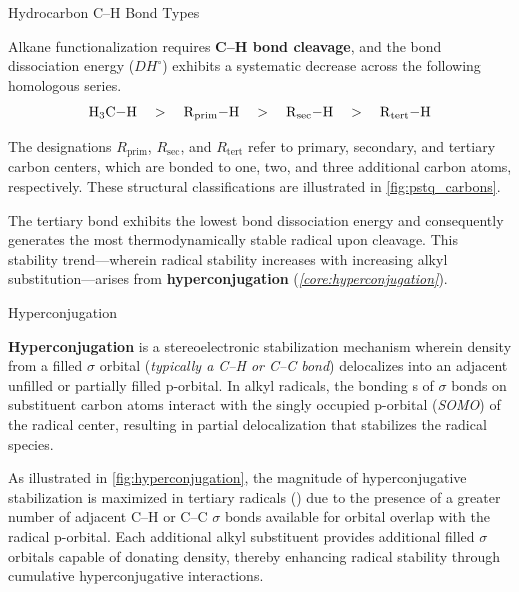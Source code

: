 \documentclass[10pt]{article}
\begin{document}
  \begin{core}{Hydrocarbon C--H Bond Types}

    Alkane functionalization requires \textbf{C--H bond cleavage}, and the bond dissociation energy ($DH^{\circ}$) exhibits a systematic decrease across the following homologous series.
    \[
      \ce{H3C-H} \quad > \quad \ce{R_{prim}-H} \quad > \quad \ce{R_{sec}-H} \quad > \quad \ce{R_{tert}-H}
    \]

    The designations $R_{\text{prim}}$, $R_{\text{sec}}$, and $R_{\text{tert}}$ refer to primary, secondary, and tertiary carbon centers, which are bonded to one, two, and three additional carbon atoms, respectively. These structural classifications are illustrated in \autoref{fig:pstq_carbons}.


    The tertiary  bond exhibits the lowest bond dissociation energy and consequently generates the most thermodynamically stable radical upon cleavage. This stability trend---wherein radical stability increases with increasing alkyl substitution---arises from \textbf{hyperconjugation} (\textit{\autoref{core:hyperconjugation}}).
    
  \end{core}

  \begin{core}[label=core:hyperconjugation]{Hyperconjugation}

    \textbf{Hyperconjugation} is a stereoelectronic stabilization mechanism wherein  density from a filled $\sigma$ orbital (\textit{typically a C--H or C--C bond}) delocalizes into an adjacent unfilled or partially filled p-orbital. In alkyl radicals, the bonding s of $\sigma$ bonds on substituent carbon atoms interact with the singly occupied p-orbital (\textit{SOMO}) of the radical center, resulting in partial  delocalization that stabilizes the radical species.


    As illustrated in \autoref{fig:hyperconjugation}, the magnitude of hyperconjugative stabilization is maximized in tertiary radicals () due to the presence of a greater number of adjacent C--H or C--C $\sigma$ bonds available for orbital overlap with the radical p-orbital. Each additional alkyl substituent provides additional filled $\sigma$ orbitals capable of donating  density, thereby enhancing radical stability through cumulative hyperconjugative interactions.

  \end{core}
\end{document}
